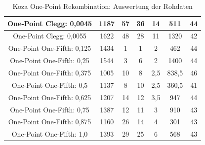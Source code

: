 \begin{table}[H]
\begin{tabular}{c | c | c | c | c | c | c}
		\hline
		One-Point Clegg: 0,0045 & 1187 & 57 & 36 & 14 & 511 & 44\\
		\hline
		One-Point Clegg: 0,0055 & 1622 & 48 & 28 & 11 & 1320 & 42\\
		\hline
		One-Point One-Fifth: 0,125 & 1434 & 1 & 1 & 2 & 462 & 44\\
		\hline
		One-Point One-Fifth: 0,25 & 1544 & 3 & 6 & 2 & 1400 & 44\\
		\hline
		One-Point One-Fifth: 0,375 & 1005 & 10 & 8 & 2,5 & 838,5 & 46\\
		\hline
		One-Point One-Fifth: 0,5 & 1137 & 8 & 10 & 2,5 & 360,5 & 41\\
		\hline
		One-Point One-Fifth: 0,625 & 1207 & 14 & 12 & 3,5 & 947 & 44\\
		\hline
		One-Point One-Fifth: 0,75 & 1387 & 12 & 11 & 3 & 910 & 43\\
		\hline
		One-Point One-Fifth: 0,875 & 1160 & 26 & 14 & 4 & 301 & 43\\
		\hline
		One-Point One-Fifth: 1,0 & 1393 & 29 & 25 & 6 & 568 & 43\\
	\end{tabular}
	\caption{Koza One-Point Rekombination: Auswertung der Rohdaten}
	\label{table:kozaOnePointRohdaten}
\end{table}

